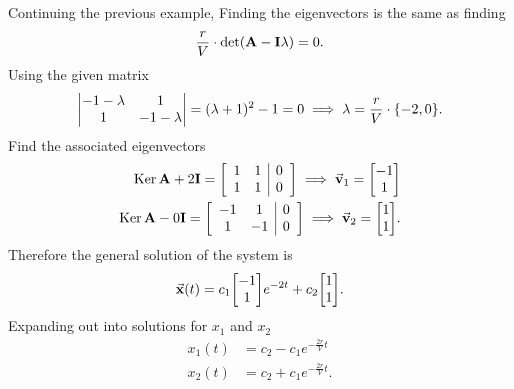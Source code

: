 \documentclass[../notes.tex]{subfiles}
\begin{document}
Continuing the previous example, Finding the eigenvectors is the same as finding
\[
	\frac{r}{V}\cdot\det(\vb{A} - \vb{I}\lambda) = 0
.\]
Using the given matrix
\[
	\mdet{
	-1 - \lambda & 1 \\
	1 & -1 - \lambda
} = (\lambda + 1)^2 - 1 = 0 \implies \lambda = \frac{r}{V}\cdot\{ -2, 0 \}
.\]
Find the associated eigenvectors
{
\newcommand{\vectorone}{\mqty[-1 \\ 1]}
\newcommand{\vectortwo}{\mqty[1 \\ 1]}
\begin{align*}
	\Ker{\vb{A}+2\vb{I}} = \left[\begin{array}{cc|c}
 1 & 1 & 0\\
 1 & 1 & 0
\end{array}\right] \implies \va{v}_1 = \vectorone \\
	\Ker{\vb{A}-0\vb{I}} = \left[\begin{array}{cc|c}
 -1 & 1 & 0\\
 1 & -1 & 0
\end{array}\right] \implies \va{v}_2 = \vectortwo
.\end{align*}
Therefore the general solution of the system is
\[
	\va{x}(t) = c_1 \vectorone e^{-2t} + c_2 \vectortwo
.\]
Expanding out into solutions for $x_1$ and $x_2$
\begin{align*}
	x_1(t) &= c_2 - c_1 e^{-\frac{2r}{V}t} \\
	x_2(t) &= c_2 + c_1 e^{-\frac{2r}{V}t}
.\end{align*}
}
\end{document}
